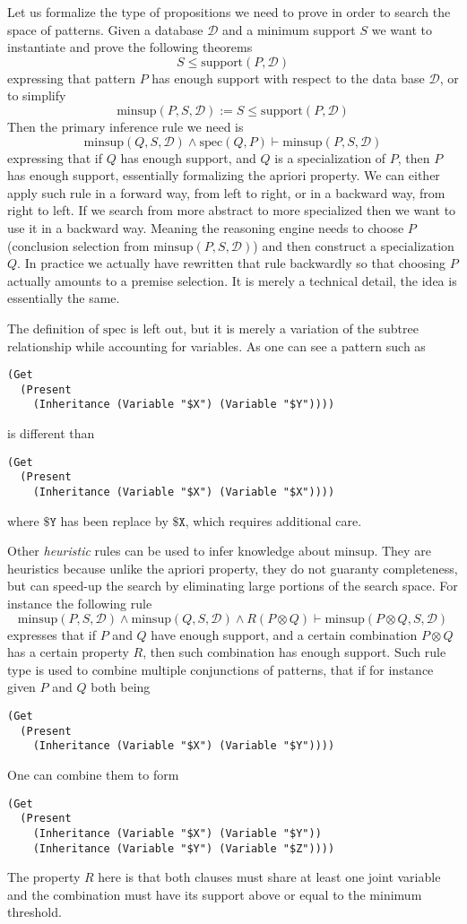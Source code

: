 \documentclass[runningheads]{llncs}
\begin{document}
Let us formalize the type of propositions we need to prove in order to
search the space of patterns. Given a database $\mathcal{D}$ and a
minimum support $S$ we want to instantiate and prove the following
theorems
$$ S \le \text{support}(P, \mathcal{D}) $$ expressing that pattern $P$
has enough support with respect to the data base $\mathcal{D}$, or to
simplify
$$ \text{minsup}(P, S, \mathcal{D}) := S \le \text{support}(P,
\mathcal{D}) $$
Then the primary inference rule we need is
$$ \text{minsup}(Q, S, \mathcal{D}) \land \text{spec}(Q, P) \vdash
\text{minsup}(P, S, \mathcal{D})$$ expressing that if $Q$ has enough
support, and $Q$ is a specialization of $P$, then $P$ has enough
support, essentially formalizing the apriori property. We can either
apply such rule in a forward way, from left to right, or in a backward
way, from right to left. If we search from more abstract to more
specialized then we want to use it in a backward way. Meaning the
reasoning engine needs to choose $P$ (conclusion selection from
$\text{minsup}(P, S, \mathcal{D})$) and then construct a
specialization $Q$.  In practice we actually have rewritten that rule
backwardly so that choosing $P$ actually amounts to a premise
selection. It is merely a technical detail, the idea is essentially
the same.

The definition of $\text{spec}$ is left out, but it is merely a
variation of the subtree relationship while accounting for
variables. As one can see a pattern such as
\begin{verbatim}
(Get
  (Present
    (Inheritance (Variable "$X") (Variable "$Y"))))
\end{verbatim}
is different than
\begin{verbatim}
(Get
  (Present
    (Inheritance (Variable "$X") (Variable "$X"))))
\end{verbatim}
where $\texttt{\$Y}$ has been replace by $\texttt{\$X}$, which
requires additional care.

Other \emph{heuristic} rules can be used to infer knowledge about
$\text{minsup}$. They are heuristics because unlike the apriori
property, they do not guaranty completeness, but can speed-up the
search by eliminating large portions of the search space. For instance
the following rule
$$ \text{minsup}(P, S, \mathcal{D}) \land \text{minsup}(Q, S,
\mathcal{D}) \land R(P \otimes Q) \vdash \text{minsup}(P \otimes Q, S,
\mathcal{D}) $$ expresses that if $P$ and $Q$ have enough support, and
a certain combination $P\otimes Q$ has a certain property $R$, then
such combination has enough support. Such rule type is used to combine
multiple conjunctions of patterns, that if for instance given $P$ and
$Q$ both being
\begin{verbatim}
(Get
  (Present
    (Inheritance (Variable "$X") (Variable "$Y"))))
\end{verbatim}
One can combine them to form
\begin{verbatim}
(Get
  (Present
    (Inheritance (Variable "$X") (Variable "$Y"))
    (Inheritance (Variable "$Y") (Variable "$Z"))))
\end{verbatim}
The property $R$ here is that both clauses must share at least one
joint variable and the combination must have its support above or
equal to the minimum threshold.
\end{document}

